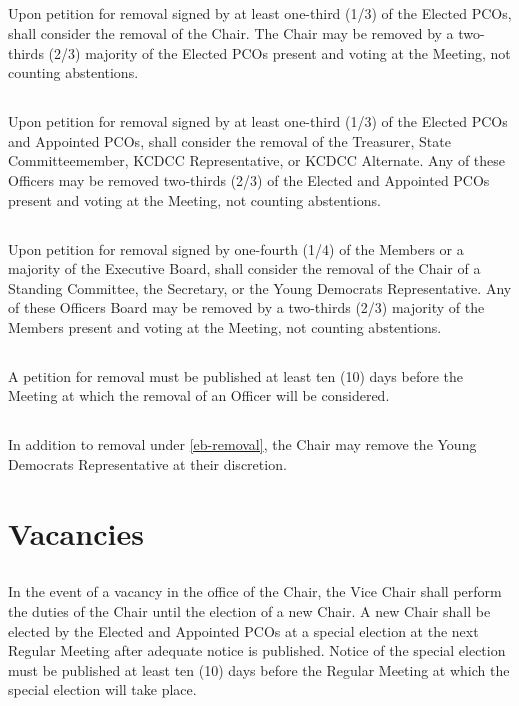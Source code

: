 \subsection{}
Upon petition for removal signed by at least one-third (1/3) of the Elected PCOs, \thedistrict{} shall consider the removal of the Chair. The Chair may be removed by a two-thirds (2/3) majority of the Elected PCOs present and voting at the Meeting, not counting abstentions.

\subsection{}
Upon petition for removal signed by at least one-third (1/3) of the Elected PCOs and Appointed PCOs, \thedistrict{} shall consider the removal of the Treasurer, State Committeemember, KCDCC Representative, or KCDCC Alternate. Any of these Officers may be removed two-thirds (2/3) of the Elected and Appointed PCOs present and voting at the Meeting, not counting abstentions.

\subsection{} \label{eb-removal}
Upon petition for removal signed by one-fourth (1/4) of the Members or a majority of the Executive Board, \thedistrict{} shall consider the removal of the Chair of a Standing Committee, the Secretary, or the Young Democrats Representative. Any of these Officers Board may be removed by a two-thirds (2/3) majority of the Members present and voting at the Meeting, not counting abstentions.

\subsection{}
A petition for removal must be published at least ten (10) days before the Meeting at which the removal of an Officer will be considered.

\subsection{}
In addition to removal under \autoref{eb-removal}, the Chair may remove the Young Democrats Representative at their discretion.

\section{Vacancies}
\subsection{}
In the event of a vacancy in the office of the Chair, the Vice Chair shall perform the duties of the Chair until the election of a new Chair. A new Chair shall be elected by the Elected and Appointed PCOs at a special election at the next Regular Meeting after adequate notice is published. Notice of the special election must be published at least ten (10) days before the Regular Meeting at which the special election will take place.

